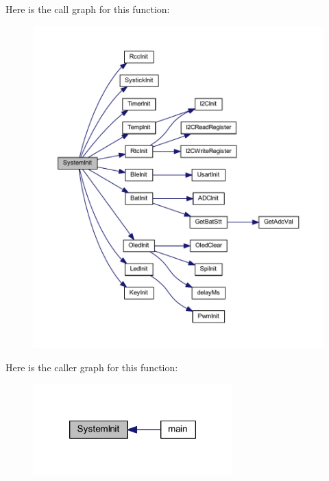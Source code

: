 \-Here is the call graph for this function\-:\nopagebreak
\begin{figure}[H]
\begin{center}
\leavevmode
\includegraphics[width=350pt]{group___b_s_p_ga93f514700ccf00d08dbdcff7f1224eb2_cgraph}
\end{center}
\end{figure}




\-Here is the caller graph for this function\-:\nopagebreak
\begin{figure}[H]
\begin{center}
\leavevmode
\includegraphics[width=218pt]{group___b_s_p_ga93f514700ccf00d08dbdcff7f1224eb2_icgraph}
\end{center}
\end{figure}


